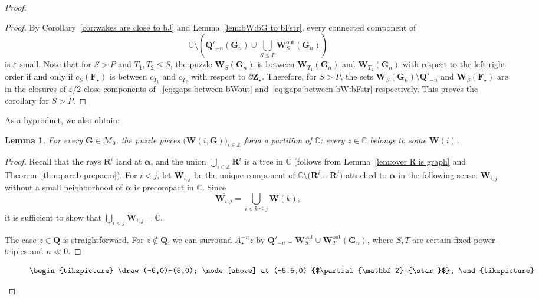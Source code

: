 \documentclass{amsart}
\newcommand{\1}{{\mathbb 1 }}
\newcommand\MM{\mathscr{M}}
\newcommand\bMM{{\pmb {\MM}}}
\newcommand{\bF}{{\mathbf F}}
\newcommand{\bZ}{{\mathbf Z}}
\newcommand{\bW}{{\mathbf W}}
\newcommand{\bQ}{{\mathbf Q}}
\newcommand{\bR}{{\mathbf R}}
\newcommand{\bG}{{\mathbf G}}
\newcommand{\str}{{\star}}
\newcommand\out{{\operatorname{out}}}
\newcommand{\C}{\mathbb{C}}
\newcommand{\Z}{\mathbb{Z}}
\newtheorem{lem}[thm]{Lemma}
\theoremstyle{remark}
\numberwithin{equation}{section}
\theoremstyle{definition}
\newcommand{\balpha}{{\boldsymbol \alpha}}
\theoremstyle{nonumberbreak}
\begin{document}
\begin{proof}
\begin{proof}
By Corollary~\ref{cor:wakes are close to bJ} and Lemma~\ref{lem:bW:bG to bFstr}, every connected component of 
\begin{equation}
\label{eq:gaps between bWout}
\C\setminus \left( \bQ'_{-n}(\bG_n) \cup \bigcup_{S\le P} \bW^\out_S(\bG_n) \right)
\end{equation} is $\varepsilon$-small. Note that for $S>P$ and $T_1,T_2\le S$, the puzzle $\bW_S(\bG_n)$ is between $\bW_{T_1}(\bG_n)$ and  $\bW_{T_2}(\bG_n)$ with respect to the left-right order if and only if $c_S(\bF_\str)$ is between $c_{T_1}$  and $c_{T_2}$ with respect to $\partial \bZ_\str$. Therefore, for $S>P$, the sets  ${\bW_S(\bG_n)\setminus \bQ'_{-n}}$ and $\bW_S(\bF_\str)$ are in the closures of  $\varepsilon/2$-close components of ~\eqref{eq:gaps between bWout} and~\eqref{eq:gaps between bW:bFstr} respectively. This proves the corollary for $S> P$.
 \end{proof}


As a byproduct, we also obtain:
\begin{lem}
\label{lem:bW is tiling}
For every $\bG\in \bMM_0$, the puzzle pieces $\big(\bW(i,\bG)\big)_{i\in \Z}$ form a partition of $\C$: every $z\in \C$ belongs to some $\bW(i)$.
\end{lem}
\begin{proof} 
Recall that the rays $\bR^i$ land at $\balpha$, and the union $\bigcup_{i\in \Z}\bR^i$ is a tree in $\C$ (follows from Lemma~\ref{lem:over R is graph} and Theorem~\ref{thm:parab prepacm}). For $i<j$, let $\bW_{i,j}$ be the unique component of $\C\setminus \big(\bR^i\cup \bR^j\big)$ attached to $\balpha$ in the following sense: $\bW_{i,j}$ without a small neighborhood of $\balpha$ is precompact in $\C$. Since \[\overline {\bW_{i,j}}= \bigcup_{i<k\le j} \bW(k),\]
it is sufficient to show that $\displaystyle{\bigcup _{i<j}\bW_{i,j}= \C}$.

The case $z\in \bQ$ is straightforward. For $z\not \in\bQ$, we can surround $A_\str^{-n} z$ by $\bQ'_{-n} \cup \bW^\out _S\cup \bW_T^\out(\bG_n)$, where  $S,T$ are certain fixed power-triples and $n\ll0$.
\end{proof}





\begin{figure}[t!]
\[\begin{tikzpicture}

\draw (-6,0)--(5,0);

\node[above] at (-5.5,0) {$\partial \bZ_\str$};


\end{tikzpicture}\]
\end{figure}
\end{proof}
\end{document}
